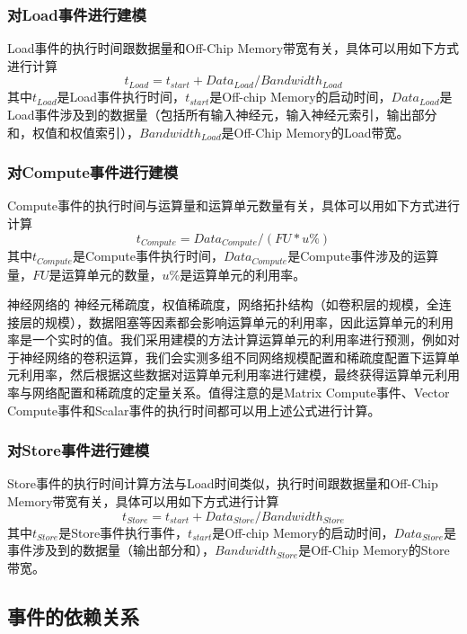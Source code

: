 \subsubsection{对Load事件进行建模}
Load事件的执行时间跟数据量和Off-Chip Memory带宽有关，具体可以用如下方式进行计算
\begin{equation}
t_{Load} = t_{start} + Data_{Load} / Bandwidth_{Load}
\end{equation}
其中$t_{Load}$是Load事件执行时间，$t_{start}$是Off-chip Memory的启动时间，$Data_{Load}$是Load事件涉及到的数据量（包括所有输入神经元，输入神经元索引，输出部分和，权值和权值索引），$Bandwidth_{Load}$是Off-Chip Memory的Load带宽。

\subsubsection{对Compute事件进行建模}
Compute事件的执行时间与运算量和运算单元数量有关，具体可以用如下方式进行计算
\begin{equation}
t_{Compute} = Data_{Compute} / (FU * u\%)
\end{equation}
其中$t_{Compute}$是Compute事件执行时间，$Data_{Compute}$是Compute事件涉及的运算量，$FU$是运算单元的数量，$u\%$是运算单元的利用率。

神经网络的 神经元稀疏度，权值稀疏度，网络拓扑结构（如卷积层的规模，全连接层的规模），数据阻塞等因素都会影响运算单元的利用率，因此运算单元的利用率是一个实时的值。我们采用建模的方法计算运算单元的利用率进行预测，例如对于神经网络的卷积运算，我们会实测多组不同网络规模配置和稀疏度配置下运算单元利用率，然后根据这些数据对运算单元利用率进行建模，最终获得运算单元利用率与网络配置和稀疏度的定量关系。值得注意的是Matrix Compute事件、Vector Compute事件和Scalar事件的执行时间都可以用上述公式进行计算。

\subsubsection{对Store事件进行建模}
Store事件的执行时间计算方法与Load时间类似，执行时间跟数据量和Off-Chip Memory带宽有关，具体可以用如下方式进行计算
\begin{equation}
t_{Store} = t_{start} + Data_{Store} / Bandwidth_{Store}
\end{equation}
其中$t_{Store}$是Store事件执行事件，$t_{start}$是Off-chip Memory的启动时间，$Data_{Store}$是事件涉及到的数据量（输出部分和），$Bandwidth_{Store}$是Off-Chip Memory的Store带宽。


\subsection{事件的依赖关系}

